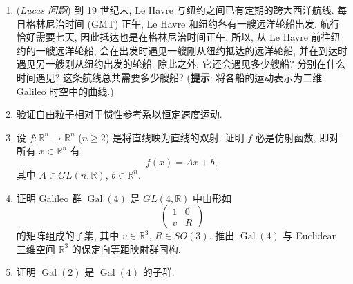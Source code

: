\begin{RiemannExercise}\label{ex:galileo-spacetime}
\begin{enumerate}[label=(\arabic*),ref=\arabic*,leftmargin=*]
\item\label{ex:lucas-transatlantic-ships}
(\emph{Lucas 问题}) 到 19 世纪末, Le Havre 与纽约之间已有定期的跨大西洋航线. 每日格林尼治时间 (GMT) 正午, Le Havre 和纽约各有一艘远洋轮船出发. 航行恰好需要七天, 因此抵达也是在格林尼治时间正午. 所以, 从 Le Havre 前往纽约的一艘远洋轮船, 会在出发时遇见一艘刚从纽约抵达的远洋轮船, 并在到达时遇见另一艘刚从纽约出发的轮船. 除此之外, 它还会遇见多少艘船? 分别在什么时间遇见? 这条航线总共需要多少艘船? (\textbf{提示}: 将各船的运动表示为二维 Galileo 时空中的曲线.)
\item\label{ex:free-particle-has-constant-velocity-in-inertial-frame}
验证自由粒子相对于惯性参考系以恒定速度运动.
\item\label{ex:straight-line-preserving-bijection-affine}
设 $f:\mathbb{R}^n\to\mathbb{R}^n$ ($n\geq2$) 是将直线映为直线的双射. 证明 $f$ 必是仿射函数, 即对所有 $x\in\mathbb{R}^n$ 有
\[
  f(x)=Ax+b,
\]
其中 $A\in GL(n,\mathbb{R})$, $b\in\mathbb{R}^n$.
\item\label{ex:galileo-group-as-euclidean-isometry-group}
证明 Galileo 群 $\operatorname{Gal}(4)$ 是 $GL(4,\mathbb{R})$ 中由形如
\[
  \begin{pmatrix}1&0\\v&R\end{pmatrix}
\]
的矩阵组成的子集, 其中 $v\in\mathbb{R}^3$, $R\in SO(3)$. 推出 $\operatorname{Gal}(4)$ 与 Euclidean 三维空间 $\mathbb{R}^3$ 的保定向等距映射群同构.
\item\label{ex:two-dimensional-galileo-subgroup}
证明 $\operatorname{Gal}(2)$ 是 $\operatorname{Gal}(4)$ 的子群.
\end{enumerate}
\end{RiemannExercise}
